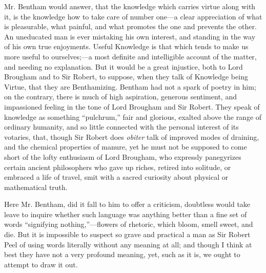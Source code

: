 Mr. Bentham would answer, that the knowledge which carries virtue
along with it, is the knowledge how to take care of number one—a
clear appreciation of what is pleasurable, what painful, and what
promotes the one and prevents the other. An uneducated man is ever
mistaking his own interest, and standing in the way of his own true
enjoyments. Useful Knowledge is that which tends to make us more
useful to ourselves;—a most definite and intelligible account
of the matter, and needing no explanation. But it would be a great
injustice, both to Lord Brougham and to Sir Robert, to suppose, when
they talk of Knowledge being Virtue, that they are Benthamizing.
Bentham had not a spark of poetry in him; on the contrary, there is
much of high aspiration, generous sentiment, and impassioned feeling
in the tone of Lord Brougham and Sir Robert. They speak of knowledge
as something ``pulchrum,'' fair and glorious, exalted above
the range of ordinary humanity, and so little connected with the
personal interest of its votaries, that, though Sir Robert does \emph{obiter}
talk of improved modes of draining, and the chemical properties of
manure, yet he must not be supposed to come short of the lofty
enthusiasm of Lord Brougham, who expressly panegyrizes certain ancient
philosophers who gave up riches, retired into solitude, or embraced a
life of travel, smit with a sacred curiosity about physical or
mathematical truth.

Here Mr. Bentham, did it fall to him to offer a criticism,
doubtless would take leave to inquire whether such language was
anything better than a fine set of words ``signifying
nothing,''—flowers of rhetoric, which bloom, smell sweet, and
die. But it is impossible to suspect so grave and practical a man as
Sir Robert Peel of using words literally without any meaning at all;
and though I think at best they have not a very profound meaning, yet,
such as it is, we ought to attempt to draw it out.

